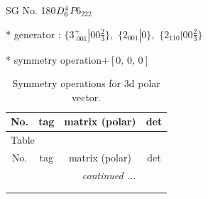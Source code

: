 \documentclass[fleqn,8pt]{jsarticle}
\begin{document}
\setcounter{MaxMatrixCols}{32}

\renewcommand{\tablename}{Table~}
\renewcommand{\figurename}{Figure~}
\begin{center}
\LARGE
SG No. 180\quad$D_{\rm 6}^{4}$\quad$P6_222$\quad[ hexagonal ]
\end{center}

* generator : $\{3^{+}_{\,\,001}|0 0 \frac{2}{3}\},\,\,\{2{}_{001}|0\},\,\,\{2{}_{110}|0 0 \frac{2}{3}\}$

* symmetry operation\quad$+\left[ 0,\, 0,\, 0 \right]$
\renewcommand{\arraystretch}{1.3}
\begin{longtable}{cccc}
\caption{Symmetry operations for 3d polar vector.}
 \\
 \hline \hline
No. & tag & matrix (polar) & det \\ \hline \endfirsthead

\multicolumn{3}{l}{\tablename\ \thetable{}} \\
 \hline \hline
No. & tag & matrix (polar) & det \\ \hline \endhead

 \hline \hline
\multicolumn{3}{r}{\footnotesize\it continued ...} \\ \endfoot

 \hline \hline
\multicolumn{3}{r}{} \\ \endlastfoot


\end{longtable}
\end{document}
